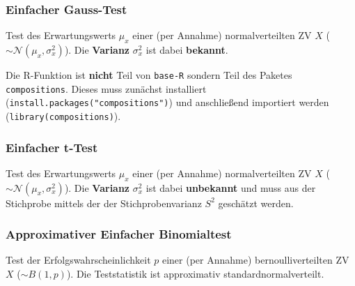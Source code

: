 \documentclass[a4paper]{article}
\newcommand\dangersign{%
 \makebox[1.8em][c]{%
 \makebox[0pt][c]{\raisebox{.15em}{\small!}}%
 \makebox[0pt][c]{\color{red}\Large$\triangle$}}}%
\begin{document}
\subsubsection{Einfacher Gauss-Test}\label{sec:Gausstest1}
Test des Erwartungswerts $\mu_x$ einer (per Annahme) normalverteilten ZV $X$ ($\sim \mathcal{N}(\mu_x, \sigma_x^2)$). Die \textbf{Varianz} $\sigma_x^2$ ist dabei \textbf{bekannt}. \\

\noindent {}

\noindent \dangersign Die R-Funktion ist \textbf{nicht} Teil von \texttt{base-R} sondern Teil des Paketes \texttt{compositions}. Dieses muss zunächst installiert (\texttt{install.packages("compositions")}) und anschließend importiert werden (\texttt{library(compositions)}).

\subsubsection{Einfacher t-Test}\label{sec:tTest1}
Test des Erwartungswerts $\mu_x$ einer (per Annahme) normalverteilten ZV $X$ ($\sim \mathcal{N}(\mu_x, \sigma_x^2)$). Die \textbf{Varianz} $\sigma_x^2$ ist dabei \textbf{unbekannt} und muss aus der Stichprobe mittels der der Stichprobenvarianz $S^2$ geschätzt werden.\\

\noindent {}

\subsubsection{Approximativer Einfacher Binomialtest}\label{sec:bintest1}
Test der Erfolgswahrscheinlichkeit $p$ einer (per Annahme) bernoulliverteilten ZV $X$ ($\sim B(1, p)$). Die Teststatistik ist approximativ standardnormalverteilt. \\

\noindent {}
\end{document}
